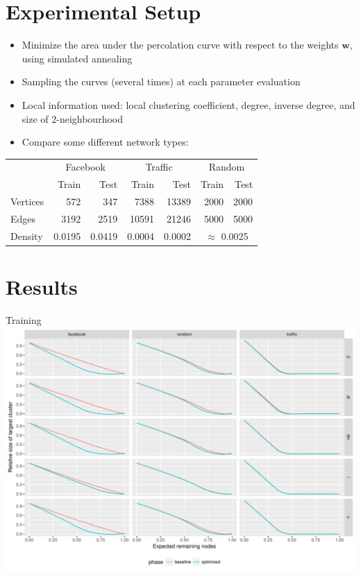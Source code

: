 \documentclass{beamer}
\begin{document}
\section{Experimental Setup}
\begin{frame}
  \begin{itemize}
  \item Minimize the area under the percolation curve with respect to the weights \(\mathbf{w}\),
    using simulated annealing
  \item Sampling the curves (several times) at each parameter evaluation
  \item Local information used: local clustering coefficient, degree, inverse degree, and size of
    2-neighbourhood
  \item Compare some different network types:
  \end{itemize}

  \begin{center}
    \begin{tabular}{lrrrrrr}
      \toprule
      & \multicolumn{2}{c}{Facebook} & \multicolumn{2}{c}{Traffic} & \multicolumn{2}{c}{Random} \\
      & Train & Test & Train & Test & Train & Test \\
      \midrule
      Vertices & 572 & 347 & 7388 & 13389 & 2000 & 2000\\
      Edges & 3192 & 2519 & 10591 & 21246 & 5000 & 5000\\
      Density & 0.0195 & 0.0419 & 0.0004 & 0.0002 & \multicolumn{2}{c}{\(\approx\) 0.0025}\\
      \bottomrule
    \end{tabular}
  \end{center}
\end{frame}



\section{Results}
\begin{frame}{Training}
  \includegraphics[width=\textwidth]{training.pdf}
\end{frame}
\end{document}
